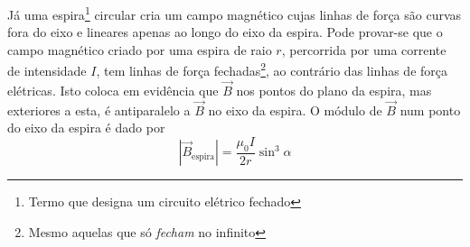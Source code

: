 \documentclass[a4paper,twoside,12pt]{article}      %
\begin{document}

%

Já uma espira\footnote{Termo que designa um circuito elétrico fechado} circular cria um campo magnético cujas linhas de força são curvas fora do eixo e lineares apenas ao longo do eixo da espira. Pode provar-se que o campo magnético criado por uma espira de raio $r$, percorrida por uma corrente de intensidade $I$, tem linhas de força fechadas\footnote{Mesmo aquelas que só \emph{fecham} no infinito}, ao contrário das linhas de força elétricas. Isto coloca em evidência que $\vec{B}$ nos pontos do plano da espira, mas exteriores a esta, é antiparalelo a $\vec{B}$ no eixo da espira. O módulo de $\vec{B}$ num ponto do eixo da espira é dado por
\begin{equation}
	|\vec{B}_{\mathrm{espira}}| = \frac{\mu_0 I}{2 r} \sin^3 \alpha
\end{equation}



\end{document}
